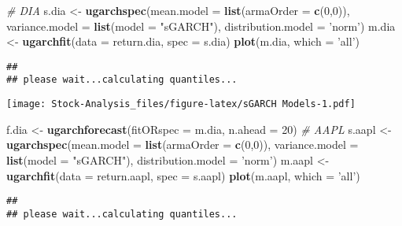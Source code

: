 \documentclass[
]{article}
\newenvironment{Shaded}{\begin{snugshade}}{\end{snugshade}}
\newcommand{\CommentTok}[1]{\textcolor[rgb]{0.56,0.35,0.01}{\textit{#1}}}
\newcommand{\DataTypeTok}[1]{\textcolor[rgb]{0.13,0.29,0.53}{#1}}
\newcommand{\DecValTok}[1]{\textcolor[rgb]{0.00,0.00,0.81}{#1}}
\newcommand{\KeywordTok}[1]{\textcolor[rgb]{0.13,0.29,0.53}{\textbf{#1}}}
\newcommand{\NormalTok}[1]{#1}
\newcommand{\StringTok}[1]{\textcolor[rgb]{0.31,0.60,0.02}{#1}}
\begin{document}
\begin{Shaded}
\begin{Highlighting}[]
\CommentTok{# DIA}
\NormalTok{s.dia <-}\StringTok{ }\KeywordTok{ugarchspec}\NormalTok{(}\DataTypeTok{mean.model =} \KeywordTok{list}\NormalTok{(}\DataTypeTok{armaOrder =} \KeywordTok{c}\NormalTok{(}\DecValTok{0}\NormalTok{,}\DecValTok{0}\NormalTok{)),}
                \DataTypeTok{variance.model =} \KeywordTok{list}\NormalTok{(}\DataTypeTok{model =} \StringTok{"sGARCH"}\NormalTok{),}
                \DataTypeTok{distribution.model =} \StringTok{'norm'}\NormalTok{)}
\NormalTok{m.dia <-}\StringTok{ }\KeywordTok{ugarchfit}\NormalTok{(}\DataTypeTok{data =}\NormalTok{ return.dia, }\DataTypeTok{spec =}\NormalTok{ s.dia)}
\KeywordTok{plot}\NormalTok{(m.dia, }\DataTypeTok{which =} \StringTok{'all'}\NormalTok{)}
\end{Highlighting}
\end{Shaded}

\begin{verbatim}
## 
## please wait...calculating quantiles...
\end{verbatim}

\texttt{[image: Stock-Analysis\_files/figure-latex/sGARCH Models-1.pdf]}

\begin{Shaded}
\begin{Highlighting}[]
\NormalTok{f.dia <-}\StringTok{ }\KeywordTok{ugarchforecast}\NormalTok{(}\DataTypeTok{fitORspec =}\NormalTok{ m.dia,}
                    \DataTypeTok{n.ahead =} \DecValTok{20}\NormalTok{)}
\CommentTok{# AAPL}
\NormalTok{s.aapl <-}\StringTok{ }\KeywordTok{ugarchspec}\NormalTok{(}\DataTypeTok{mean.model =} \KeywordTok{list}\NormalTok{(}\DataTypeTok{armaOrder =} \KeywordTok{c}\NormalTok{(}\DecValTok{0}\NormalTok{,}\DecValTok{0}\NormalTok{)),}
                \DataTypeTok{variance.model =} \KeywordTok{list}\NormalTok{(}\DataTypeTok{model =} \StringTok{"sGARCH"}\NormalTok{),}
                \DataTypeTok{distribution.model =} \StringTok{'norm'}\NormalTok{)}
\NormalTok{m.aapl <-}\StringTok{ }\KeywordTok{ugarchfit}\NormalTok{(}\DataTypeTok{data =}\NormalTok{ return.aapl, }\DataTypeTok{spec =}\NormalTok{ s.aapl)}
\KeywordTok{plot}\NormalTok{(m.aapl, }\DataTypeTok{which =} \StringTok{'all'}\NormalTok{)}
\end{Highlighting}
\end{Shaded}

\begin{verbatim}
## 
## please wait...calculating quantiles...
\end{verbatim}
\end{document}
